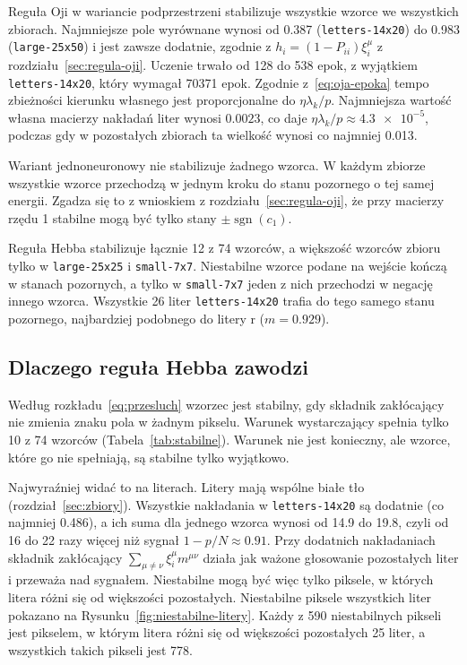 \noindent Reguła Oji w wariancie podprzestrzeni stabilizuje wszystkie wzorce we wszystkich zbiorach. Najmniejsze pole wyrównane wynosi od \num{0.387} (\texttt{letters-14x20}) do \num{0.983} (\texttt{large-25x50}) i jest zawsze dodatnie, zgodnie z $h_i = (1 - P_{ii}) \xi^\mu_i$ z rozdziału~\ref{sec:regula-oji}. Uczenie trwało od 128 do 538 epok, z wyjątkiem \texttt{letters-14x20}, który wymagał \num{70371} epok. Zgodnie z~\eqref{eq:oja-epoka} tempo zbieżności kierunku własnego jest proporcjonalne do $\eta \lambda_k / p$. Najmniejsza wartość własna macierzy nakładań liter wynosi $\num{0.0023}$, co daje $\eta \lambda_k / p \approx \num{4.3e-5}$, podczas gdy w pozostałych zbiorach ta wielkość wynosi co najmniej \num{0.013}.

Wariant jednoneuronowy nie stabilizuje żadnego wzorca. W każdym zbiorze wszystkie wzorce przechodzą w jednym kroku do stanu pozornego o tej samej energii. Zgadza się to z wnioskiem z rozdziału~\ref{sec:regula-oji}, że przy macierzy rzędu 1 stabilne mogą być tylko stany $\pm \operatorname{sgn}(c_1)$.

Reguła Hebba stabilizuje łącznie 12 z 74 wzorców, a większość wzorców zbioru tylko w \texttt{large-25x25} i \texttt{small-7x7}. Niestabilne wzorce podane na wejście kończą w stanach pozornych, a tylko w \texttt{small-7x7} jeden z nich przechodzi w negację innego wzorca. Wszystkie 26 liter \texttt{letters-14x20} trafia do tego samego stanu pozornego, najbardziej podobnego do litery r ($m = \num{0.929}$).

\subsection{Dlaczego reguła Hebba zawodzi}
\label{sec:dlaczego-hebb}

Według rozkładu~\eqref{eq:przesluch} wzorzec jest stabilny, gdy składnik zakłócający nie zmienia znaku pola w żadnym pikselu. Warunek wystarczający spełnia tylko 10 z 74 wzorców (Tabela~\ref{tab:stabilne}). Warunek nie jest konieczny, ale wzorce, które go nie spełniają, są stabilne tylko wyjątkowo.

Najwyraźniej widać to na literach. Litery mają wspólne białe tło (rozdział~\ref{sec:zbiory}). Wszystkie nakładania w \texttt{letters-14x20} są dodatnie (co najmniej \num{0.486}), a ich suma dla jednego wzorca wynosi od \num{14.9} do \num{19.8}, czyli od 16 do 22 razy więcej niż sygnał $1 - p/N \approx \num{0.91}$. Przy dodatnich nakładaniach składnik zakłócający $\sum_{\mu \ne \nu} \xi^\mu_i m^{\mu\nu}$ działa jak ważone głosowanie pozostałych liter i przeważa nad sygnałem. Niestabilne mogą być więc tylko piksele, w których litera różni się od większości pozostałych. Niestabilne piksele wszystkich liter pokazano na Rysunku~\ref{fig:niestabilne-litery}. Każdy z 590 niestabilnych pikseli jest pikselem, w którym litera różni się od większości pozostałych 25 liter, a wszystkich takich pikseli jest 778.

